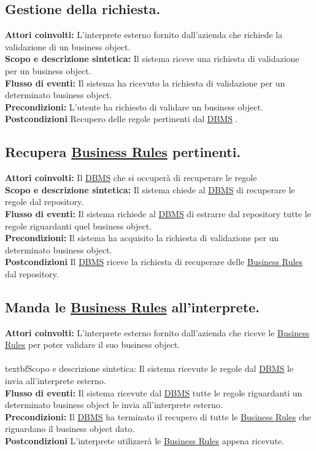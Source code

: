 \subsection{Gestione della richiesta.}
\textbf{Attori coinvolti:} L'interprete esterno fornito dall'azienda che richiede la validazione di un business object.\\
\textbf{Scopo e descrizione sintetica:} Il sistema riceve una richiesta di validazione per un business object.\\
\textbf{Flusso di eventi:} Il sistema ha ricevuto la richiesta di validazione per un determinato business object.\\
\textbf{Precondizioni:} L'utente ha richiesto di validare un business object.\\
\textbf{Postcondizioni} Recupero delle regole pertinenti dal \underline{DBMS} .

\subsection{Recupera \underline{Business Rules} pertinenti.}
\textbf{Attori coinvolti:} Il \underline{DBMS} che si occuper\`a di recuperare le regole\\
\textbf{Scopo e descrizione sintetica:} Il sistema chiede al \underline{DBMS} di recuperare le regole dal repository.\\
\textbf{Flusso di eventi:} Il sistema richiede al \underline{DBMS} di estrarre dal repository tutte le regole riguardanti quel business object.\\
\textbf{Precondizioni:} Il sistema ha acquisito la richiesta di validazione per un determinato business object.\\
\textbf{Postcondizioni} Il \underline{DBMS} riceve la richiesta di recuperare delle \underline{Business Rules} dal repository.
\subsection{Manda le \underline{Business Rules} all'interprete.}
\textbf{Attori coinvolti:} L'interprete esterno fornito dall'azienda che riceve le \underline{Business Rules} per poter validare il suo business object.\\
\\textbf{Scopo e descrizione sintetica:} Il sistema ricevute le regole dal \underline{DBMS} le invia all'interprete esterno.\\
\textbf{Flusso di eventi:} Il sistema ricevute dal \underline{DBMS} tutte le regole riguardanti un determinato business object le invia all'interprete esterno.\\
\textbf{Precondizioni:} Il \underline{DBMS} ha terminato il recupero di tutte le \underline{Business Rules} che riguardano il business object dato.\\
\textbf{Postcondizioni} L'interprete utilizzer\`a le \underline{Business Rules} appena ricevute.

